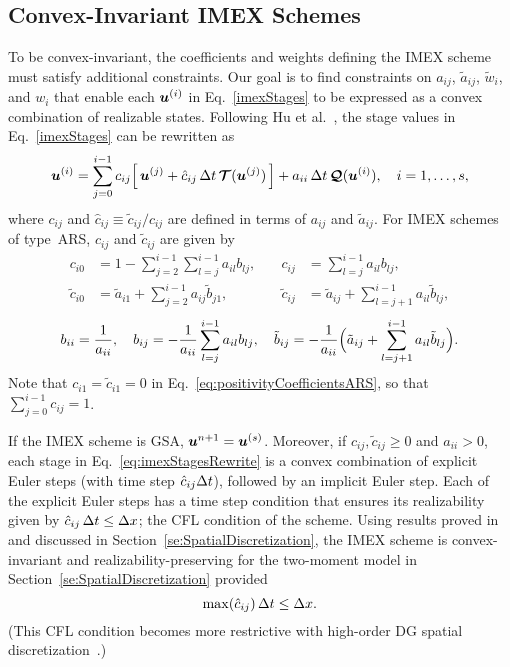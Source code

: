 \subsection{Convex-Invariant IMEX Schemes}

To be convex-invariant, the coefficients and weights defining the IMEX scheme must satisfy additional constraints.
Our goal is to find constraints on $a_{ij}$, $\tilde{a}_{ij}$, $\tilde{w}_{i}$, and $w_{i}$ that enable each $\boldsymbol{u}^{(i)}$ in Eq.~\eqref{imexStages} to be expressed as a convex combination of realizable states.  
Following Hu et al.~\cite{hu_etal_2018}, the stage values in Eq.~\eqref{imexStages} can be rewritten as
\begin{equation}
  \boldsymbol{u}^{(i)}
  =\sum_{j=0}^{i-1}c_{ij}\Big[\,\boldsymbol{u}^{(j)}+\hat{c}_{ij}\,\Delta t\,\boldsymbol{\mathcal{T}}(\boldsymbol{u}^{(j)})\,\Big] + a_{ii}\,\Delta t\,\boldsymbol{\mathcal{Q}}(\boldsymbol{u}^{(i)}),\quad i=1,\ldots,s,
  \label{eq:imexStagesRewrite}
\end{equation}
where $c_{ij}$ and $\hat{c}_{ij}\equiv\tilde{c}_{ij}/c_{ij}$ are defined in terms of $a_{ij}$ and $\tilde{a}_{ij}$.
For IMEX schemes of type~ARS, $c_{ij}$ and $\tilde{c}_{ij}$ are given by~\cite{hu_etal_2018}
    \begin{equation}
     \begin{aligned}
      c_{i0} &= 1-\sum_{j=2}^{i-1}\sum_{l=j}^{i-1}a_{il}b_{lj}, \quad &
      c_{ij} &= \sum_{l=j}^{i-1}a_{il}b_{lj}, \\
      \tilde{c}_{i0} &= \tilde{a}_{i1}+\sum_{j=2}^{i-1}a_{ij}\tilde{b}_{j1}, \quad &
      \tilde{c}_{ij} &= \tilde{a}_{ij}+\sum_{l=j+1}^{i-1}a_{il}\tilde{b}_{lj},  
     \end{aligned}
     \label{eq:positivityCoefficientsARS}
    \end{equation}
    \begin{equation}
      b_{ii} = \frac{1}{a_{ii}}, \quad
      b_{ij} = -\frac{1}{a_{ii}}\sum_{l=j}^{i-1}a_{il}b_{lj}, \quad
      \tilde{b}_{ij} = -\frac{1}{a_{ii}}\Big(\tilde{a}_{ij}+\sum_{l=j+1}^{i-1}a_{il}\tilde{b}_{lj}\Big).  
    \end{equation}
Note that $c_{i1}=\tilde{c}_{i1}=0$ in Eq.~\eqref{eq:positivityCoefficientsARS}, so that $\sum_{j=0}^{i-1}c_{ij}=1$.

If the IMEX scheme is GSA, $\boldsymbol{u}^{n+1} = \boldsymbol{u}^{(s)}$.  
Moreover, if $c_{ij},\tilde{c}_{ij}\ge0$ and $a_{ii}>0$, each stage in Eq.~\eqref{eq:imexStagesRewrite} is a convex combination of explicit Euler steps (with time step $\hat{c}_{ij}\Delta t$), followed by an implicit Euler step.  
Each of the explicit Euler steps has a time step condition that ensures its realizability given by $\hat{c}_{ij}\,\Delta t\leq\Delta x$; the CFL condition of the scheme.
Using results proved in~\cite{chu_etal_2018} and discussed in Section~\ref{se:SpatialDiscretization}, the IMEX scheme is convex-invariant and realizability-preserving for the two-moment model in Section~\ref{se:SpatialDiscretization} provided
\begin{equation}
  \max(\hat{c}_{ij})\,\Delta t \leq \Delta x.  
\end{equation}
(This CFL condition becomes more restrictive with high-order DG spatial discretization~\cite{chu_etal_2018}.)

